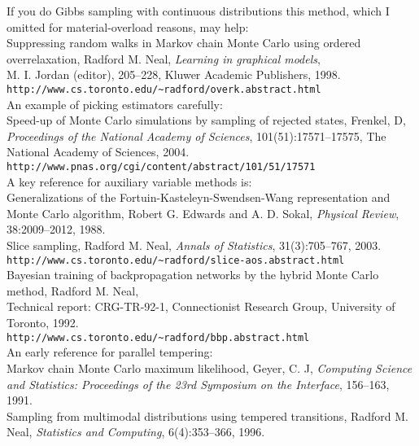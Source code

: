 \documentclass[25pt,landscape]{foils}
\newcommand{\M}{\mathcal{M}}
\begin{document}
{\tiny

If you do Gibbs sampling with continuous distributions this method, which I omitted for
material-overload reasons, may help:\\
Suppressing random walks in Markov chain Monte Carlo using ordered overrelaxation, Radford M. Neal, \textsl{Learning in graphical models},\\M. I. Jordan (editor), 205--228, Kluwer Academic Publishers, 1998.
\texttt{http://www.cs.toronto.edu/\~{}radford/overk.abstract.html}\\[-0.1in]

An example of picking estimators carefully:\\
Speed-up of Monte Carlo simulations by sampling of rejected states, Frenkel, D, \textsl{Proceedings of the National Academy of Sciences}, 101(51):17571--17575, The National Academy of Sciences, 2004.
\texttt{http://www.pnas.org/cgi/content/abstract/101/51/17571}\\[-0.1in]

A key reference for auxiliary variable methods is:\\
Generalizations of the Fortuin-Kasteleyn-Swendsen-Wang representation and Monte Carlo algorithm, Robert G. Edwards and A. D. Sokal, \textsl{Physical Review}, 38:2009--2012, 1988.\\[-0.1in]

Slice sampling, Radford M. Neal, \textsl{Annals of Statistics}, 31(3):705--767, 2003.
\texttt{http://www.cs.toronto.edu/\~{}radford/slice-aos.abstract.html}\\[-0.1in]

Bayesian training of backpropagation networks by the hybrid Monte Carlo method, Radford M. Neal,\\%
Technical report: CRG-TR-92-1, Connectionist Research Group, University of Toronto, 1992.\\
\texttt{http://www.cs.toronto.edu/\~{}radford/bbp.abstract.html}\\[-0.1in]

An early reference for parallel tempering:\\
Markov chain Monte Carlo maximum likelihood, Geyer, C. J, \textsl{Computing
Science and Statistics: Proceedings of the 23rd Symposium on the Interface},
156--163, 1991.\\[-0.1in]

Sampling from multimodal distributions using tempered transitions, Radford M. Neal, \textsl{Statistics and Computing}, 6(4):353--366, 1996.\\[-0.1in]

}
\vspace*{-0.5cm}
\end{document}

